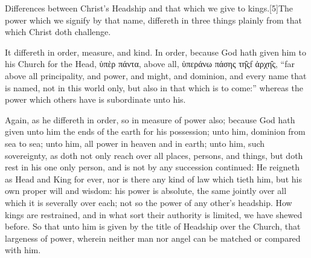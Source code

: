 Differences between Christ’s Headship and that which we give to kings.[5]The power which we signify by that name, differeth in three things plainly from that which Christ doth challenge.

It differeth in order, measure, and kind. In order, because God hath given him to his Church for the Head, ὑπὲρ πάντα, above all, ὑπεράνω πάσης τη̑ςf ἀρχη̑ς, “far above all principality, and power, and might, and dominion, and every name that is named, not in this world only, but also in that which is to come:” whereas the power which others have is subordinate unto his.

Again, as he differeth in order, so in measure of power also; because God hath given unto him the ends of the earth for his possession; unto him, dominion from sea to sea; unto him, all power in heaven and in earth; unto him, such sovereignty, as doth not only reach over all places, persons, and things, but doth rest in his one only person, and is not by any succession continued: He reigneth as Head and King for ever, nor is there any kind of law which tieth him, but his own proper will and wisdom: his power is absolute, the same jointly over all which it is severally over each; not so the power of any other’s headship. How kings are restrained, and in what sort their authority is limited, we have shewed before. So that unto him is given by the title of Headship over the Church, that largeness of power, wherein neither man nor angel can be matched or compared with him.


